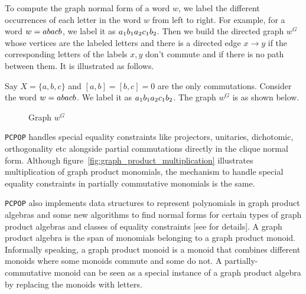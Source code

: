 To compute the graph normal form of a word $w$, we label the different occurrences of each letter in the word $w$ from left to right. For example, for a word $w=a  b  a  c  b$, we label it as $a_1  b_1  a_2  c_1  b_2$. Then we build the directed graph $w^G$ whose vertices are the labeled letters and there is a directed edge $x \rightarrow y$ if the corresponding letters of the labels $x,y$ don't commute and if there is no path between them. It is illustrated as follows.
\begin{example}
Say $X=\{a,b,c\}$ and $[a,b] = [b,c]=0$ are the only commutations. Consider the word $w=a  b  a  c  b$. We label it as $a_1  b_1  a_2  c_1  b_2$. The graph $w^G$ is as shown below.
\begin{figure}[h!]
\centering
{}
\caption{Graph $w^G$}
\end{figure}
\end{example}
\texttt{PCPOP} handles special equality constraints like projectors, unitaries, dichotomic, orthogonality etc alongside partial commutations directly in the clique normal form. Although figure~\ref{fig:graph_product_multiplication} illustrates multiplication of graph product monomials, the mechanism to handle special equality constraints in partially commutative monomials is the same.


\texttt{PCPOP} also implements data structures to represent polynomials in graph product algebras and some new algorithms to find normal forms for certain types of graph product algebras and classes of equality constraints [see \cite{} for details]. A graph product algebra is the span of monomials belonging to a graph product monoid. Informally speaking, a graph product monoid is a monoid that combines different monoids where some monoids commute and some do not. A partially-commutative monoid can be seen as a special instance of a graph product algebra by replacing the monoids with letters.

